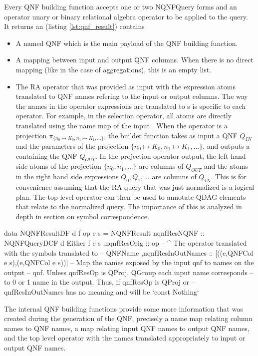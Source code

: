 Every QNF building function accepts one or two {NQNFQuery} forms and an
operator unary or binary relational algebra operator to be applied to the query.
It returns an  (listing \ref{lst:qnf_result}) contains

\begin{itemize}
\item A  named QNF which is the main payload of the QNF building function.
\item A mapping between input and output QNF columns. When there is no direct mapping
 (like in the case of aggregations), this is an empty list.
\item The RA operator that was provided as input with the expression atoms
  translated to QNF names
  refering to the input or output columns. The way the names in the operator expressions are translated to
  s is specific to each operator. For example,
  in the selection operator, all atoms are directly translated
  using the name map of the input . When the operator is a
  projection \(\pi_{\{n_0 \mapsto K_0, n_1 \mapsto K_1, ...\}}\), the
  builder function takes as input a QNF \(Q_{IN}\) and the parameters of the projection
  \(\{n_0 \mapsto K_0, n_1 \mapsto K_1, ...\}\), and outputs a  containing the
  QNF \(Q_{OUT}\).
  In the projection operator output, the left hand side atoms of the projection \(\{n_0, n_1, ...\}\) are
  columns of \(Q_{OUT}\) and the atoms in the right hand side expressions \(Q_0,Q_1,...\) are columns of \(Q_{IN}\).
  This is for convenience assuming that the RA
  query that was just normalized is a logical plan. The top level
  operator can then be used to annotate QDAG elements that relate to
  the normalized query. The importance of this is analyzed in depth in
  section \label{sel:symbol_correspondence} on symbol correspondence.

\end{itemize}

\begin{code}
  \begin{haskellcode}
    data NQNFResultDF d f op e s =
    NQNFResult
    { nqnfResNQNF :: NQNFQueryDCF d Either f e s
      ,nqnfResOrig :: op
      -- ^ The operator translated with the symbols translated to
      -- QNFName
      ,nqnfResInOutNames :: [((e,QNFCol e s),(e,QNFCol e s))]
      -- Map the names exposed by the input qnf to names on the output
      -- qnf. Unless qnfResOp is QProj, QGroup each input name corresponds
      -- to 0 or 1 name in the output. Thus, if qnfResOp is QProj or
      -- qnfResInOutNames has no meaning and will be `const Nothing`      
    }
  \end{haskellcode}
  \caption{\label{lst:qnf_result}The internal QNF building functions
    provide some more information that was created during the
    generation of the QNF, precisely a name map relating column names
    to QNF names, a map relating input QNF names to output QNF names,
    and the top level operator with the names translated appropriately
    to input or output QNF names.}
\end{code}

